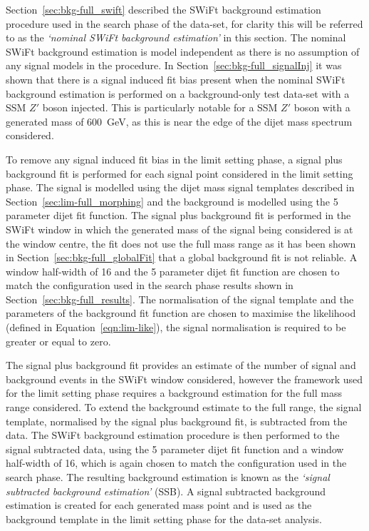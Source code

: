 Section~\ref{sec:bkg-full_swift} described the SWiFt background estimation procedure used in the search phase of the \lm{} data-set, 
for clarity this will be referred to as the \textit{`nominal SWiFt background estimation'} in this section.
The nominal SWiFt background estimation is model independent as there is no assumption of any signal models in the procedure.
In Section~\ref{sec:bkg-full_signalInj} it was shown that there is a signal induced fit bias present when
the nominal SWiFt background estimation is performed on a background-only test data-set with a SSM $Z'$ boson injected.
This is particularly notable for a SSM $Z'$ boson with a generated mass of 600~GeV,
as this is near the edge of the dijet mass spectrum considered.

To remove any signal induced fit bias in the limit setting phase, a signal plus background fit
is performed for each signal point considered in the limit setting phase.
The signal is modelled using the dijet mass signal templates described in Section~\ref{sec:lim-full_morphing}
and the background is modelled using the 5 parameter dijet fit function.
The signal plus background fit is performed in the SWiFt window in which the generated mass of the signal being considered is at the window centre,
the fit does not use the full mass range as it has been shown in Section~\ref{sec:bkg-full_globalFit} that a global background fit is not reliable.
A window half-width of 16 and the 5 parameter dijet fit function are chosen to match the configuration used in the search phase results shown in Section~\ref{sec:bkg-full_results}.
The normalisation of the signal template and the parameters of the background fit function are
chosen to maximise the likelihood (defined in Equation~\ref{eqn:lim-like}), the signal normalisation is required to be greater or equal to zero.

The signal plus background fit provides an estimate of the number of signal and background events in the SWiFt window considered,
however the framework used for the limit setting phase requires a background estimation for the full mass range considered.
To extend the background estimate to the full range, the signal template, normalised by the signal plus background fit, is subtracted from the data.
The SWiFt background estimation procedure is then performed to the signal subtracted data,
using the 5 parameter dijet fit function and a window half-width of 16, which is again chosen to match the configuration used in the search phase.
The resulting background estimation is known as the \textit{`signal subtracted background estimation'} (SSB).
A signal subtracted background estimation is created for each generated mass point and
is used as the background template in the limit setting phase for the \lm{} data-set analysis.

